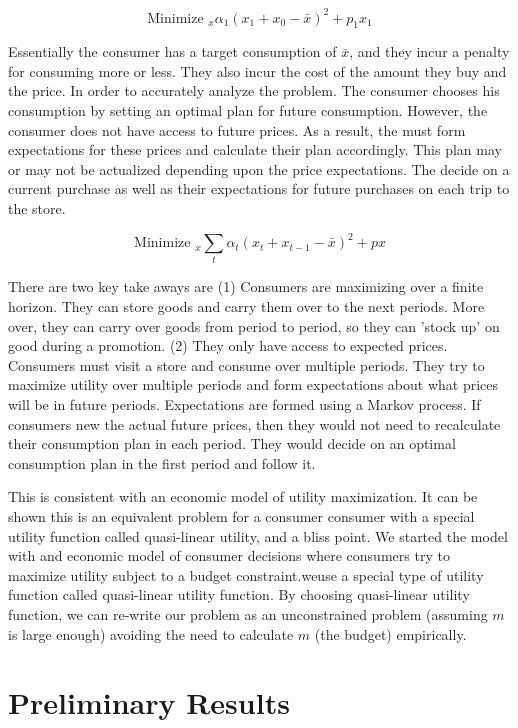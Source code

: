 \documentclass{article}
\begin{document}
$$ \text{Minimize }_{x}  \alpha_1 (x_1 +x_0 - \bar{x})^2 + p_1 x_1 $$

Essentially the consumer has a target consumption of $\bar{x}$, and they incur a penalty for consuming more or less. They also incur the cost of the amount they buy and the price. In order to accurately analyze the problem. The consumer chooses his consumption by setting an optimal plan for future consumption. However, the consumer does not have access to future prices. As a result, the must form expectations for these prices and calculate their plan accordingly. This plan may or may not be actualized depending upon the price expectations. The decide on a current purchase as well as their expectations for future purchases on each trip to the store.

$$ \text{Minimize }_{x} \sum_t \alpha_t (x_t + x_{t-1} - \bar{x})^2 + p x $$

There are two key take aways are (1) Consumers are maximizing over a finite horizon. They can store goods and carry them over to the next periods. More over, they can carry over goods from period to period, so they can 'stock up' on good during a promotion. (2) They only have access to expected prices. Consumers must visit a store and consume over multiple periods. They try to maximize utility over multiple periods and form expectations about what prices will be in future periods. Expectations are formed using a Markov process. If consumers new the actual future prices, then they would not need to recalculate their consumption plan in each period. They would decide on an optimal consumption plan in the first period and follow it.

This is consistent with an economic model of utility maximization. It can be shown this is an equivalent problem for a consumer consumer with a special utility function called quasi-linear utility, and a bliss point. We started the model with and economic model of consumer decisions where consumers try to maximize utility subject to a budget constraint.weuse a special type of utility function called quasi-linear utility function. By choosing quasi-linear utility function, we can re-write our problem as an unconstrained problem (assuming $m$ is large enough) avoiding the need to calculate $m$ (the budget) empirically. 

\section{Preliminary Results}
\end{document}

